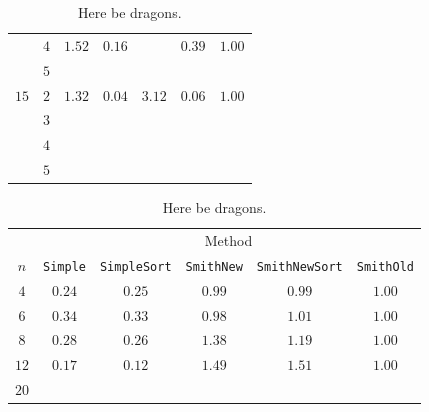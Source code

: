 \begin{table}[htbp]
\begin{tabular}{ccccccc}
         & $4$ & $1.52$ & $0.16$     &          & $0.39$       & $1.00$   \\
         & $5$ &        &            &          &              &          \\
    \cmidrule(r){1-2}
    $15$ & $2$ & $1.32$ & $0.04$     & $3.12$   & $0.06$       & $1.00$   \\
         & $3$ &        &            &          &              &          \\
         & $4$ &        &            &          &              &          \\
         & $5$ &        &            &          &              &          \\
    \bottomrule
  \end{tabular}
  \caption[Here be dragons]{Here be dragons.\label{tab:trees-sausage}}
\end{table}

\begin{table}[htbp]
  \centering
  \small
  \begin{tabular}{cccccc}
    \toprule
         & \multicolumn{5}{c}{Method}                               \\
    \cmidrule(l){2-6}
    $n$  & \texttt{Simple} & \texttt{SimpleSort} & \texttt{SmithNew} & \texttt{SmithNewSort} & \texttt{SmithOld} \\
    \cmidrule(r){1-1}\cmidrule(l){2-6}
    $4$  & $0.24$ & $0.25$     & $0.99$   & $0.99$       & $1.00$   \\
    $6$  & $0.34$ & $0.33$     & $0.98$   & $1.01$       & $1.00$   \\
    $8$  & $0.28$ & $0.26$     & $1.38$   & $1.19$       & $1.00$   \\
    $12$ & $0.17$ & $0.12$     & $1.49$   & $1.51$       & $1.00$   \\
    $20$ &        &            &          &              &          \\
    \bottomrule
  \end{tabular}
  \caption[Here be dragons]{Here be dragons.\label{tab:iterations-solids-ratio}}
\end{table}

